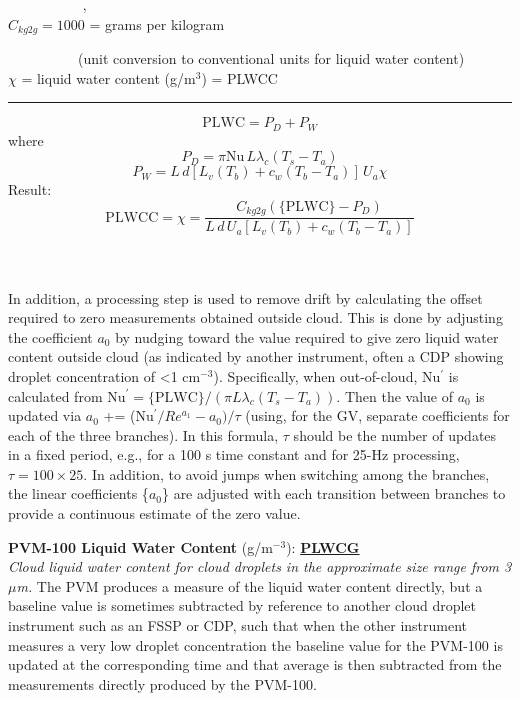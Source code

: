 \begin{hangparagraphs}
{\begin{minipage}[t]{0.95\textwidth}
~~~~~~~~~~%
, \\
$C_{kg2g}=1000$
= grams per kilogram 

~~~~~~~~~~(unit conversion to conventional units for liquid
water content)\\
$\chi$ = liquid water
content (g/m$^{3}$) = PLWCC

\rule[0.5ex]{1\linewidth}{1pt}
\[
\mathrm{PLWC}=P_{D}+P_{W}
\]
where
\[
P_{D}=\pi\mathrm{Nu}\,L\lambda_{c}(T_{s}-T_{a})
\]
\[
P_{W}=L\,d[L_{v}(T_{b})+c_{w}(T_{b}-T_{a})]\,U_{a}\chi
\]
Result:
\[
\mathrm{PLWCC}=\chi=\frac{C_{kg2g}(\mathrm{\{PLWC\}}-P_{D})}{L\,d\,U_{a}[L_{v}(T_{b})+c_{w}(T_{b}-T_{a})]}
\]
%
\end{minipage}}\\
\\
In addition, a processing step is used to remove drift by calculating
the offset required to zero measurements obtained outside cloud. This
is done by adjusting the coefficient $a_{0}$ by nudging toward the
value required to give zero liquid water content outside cloud (as
indicated by another instrument, often a CDP showing droplet concentration
of <1 cm$^{-3}$). Specifically, when out-of-cloud, Nu$^{\prime}$
is calculated from Nu$^{\prime}=\mathrm{\{PLWC\}}/(\pi L\lambda_{c}(T_{s}-T_{a}))$.
Then the value of $a_{0}$ is updated via $a_{0}$ += (Nu$^{\prime}/Re^{a_{1}}-a_{0})/\tau$
(using, for the GV, separate coefficients for each of the three branches).
In this formula, $\tau$ should be the number of updates in a fixed
period, e.g., for a 100 s time constant and for 25-Hz processing,
$\tau=100\times25$. In addition, to avoid jumps when switching among
the branches, the linear coefficients \{$a_{0}$\} are adjusted with
each transition between branches to provide a continuous estimate
of the zero value.

\textbf{PVM-100 Liquid Water Content} (g/m$^{-3}$):\textbf{ }\textbf{\uline{PLWCG}}\textbf{}\\
\emph{Cloud liquid water content for cloud droplets in the approximate
size range from 3 $\mu$m. }The PVM produces a measure
of the liquid water content directly, but a baseline value is sometimes
subtracted by reference to another cloud droplet instrument such as
an FSSP or CDP, such that when the other instrument measures a very
low droplet concentration the baseline value for the PVM-100 is updated
at the corresponding time and that average is then subtracted from
the measurements directly produced by the PVM-100.\label{punch:5-1}


\end{hangparagraphs}
